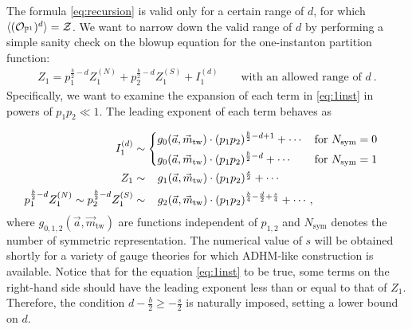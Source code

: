 \documentclass[letterpaper, 11pt]{article}
\def\IP{\mathbb{P}}
\def\CZ{{\cal Z}}
\begin{document}
The formula \eqref{eq:recursion} is valid only for a certain range of $d$, for which $\langle (\mathcal{O}_{\IP^1})^{d}\rangle = \CZ$. We want to narrow down the valid range of $d$ by performing a simple sanity check on the blowup equation for the one-instanton partition function:
\begin{align}
  \label{eq:1inst}
  Z_1 = p_1^{\frac{b}{2}-d}Z^{(N)}_1  + p_2^{\frac{b}{2}-d}  Z^{(S)}_1  + I_1^{(d)} \qquad \text{with an allowed range of $d$} \ .
\end{align}
Specifically, we want to examine the expansion of each term in \eqref{eq:1inst} in powers of $p_1p_2 \ll 1$. The  leading exponent of each term behaves as {\allowdisplaybreaks
\begin{align}
\begin{split}
  I_1^{(d)} &\sim \begin{dcases}
    g_0(\vec{a},  \vec{m}_{\text{tw}})\cdot  (p_1p_2)^{\frac{b}{2}-d + 1} + \cdots   &  \text{for }N_\text{sym} = 0\\
    g_0(\vec{a},  \vec{m}_{\text{tw}})\cdot (p_1p_2)^{\frac{b}{2}-d } + \cdots    &  \text{for }N_\text{sym} = 1
\end{dcases}
   \\
  Z_1 &\sim   \ \ \, g_1(\vec{a},  \vec{m}_{\text{tw}})\cdot (p_1p_2)^{\frac{s}{2}}  + \cdots   \\
  p_1^{\frac{b}{2}-d}Z_1^{(N)}\sim p_2^{\frac{b}{2}-d}  Z^{(S)}_1 &\sim  \ \ \,  g_2(\vec{a},  \vec{m}_{\text{tw}})\cdot  (p_1p_2)^{\frac{b}{4}-\frac{d}{2}+\frac{s}{4}}   + \cdots   ,
  \end{split}
\end{align}
where $g_{0, 1, 2}(\vec{a}, \vec{m}_{\text{tw}})$ are functions independent of $p_{1, 2}$ and $N_{\text{sym}}$ denotes the number of symmetric representation. The numerical value of $s$ will be obtained shortly for a variety of gauge theories for which ADHM-like construction is available.
Notice that for the equation \eqref{eq:1inst} to be true, some terms on the right-hand side should have the leading exponent less than or equal to that of $Z_1$. Therefore, the condition $d - \frac{b}{2} \geq -\frac{s}{2}$ is naturally imposed, setting a lower bound on $d$. 

}
\end{document}
